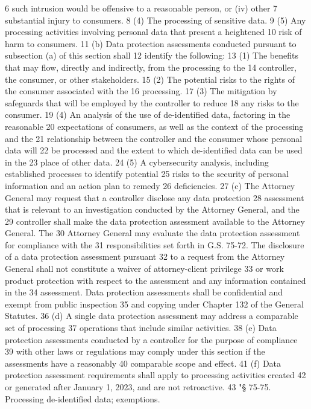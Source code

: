 6 such intrusion would be offensive to a reasonable person, or (iv) other
7 substantial injury to consumers.
8 (4) The processing of sensitive data.
9 (5) Any processing activities involving personal data that present a heightened
10 risk of harm to consumers.
11 (b) Data protection assessments conducted pursuant to subsection (a) of this section shall
12 identify the following:
13 (1) The benefits that may flow, directly and indirectly, from the processing to the
14 controller, the consumer, or other stakeholders.
15 (2) The potential risks to the rights of the consumer associated with the
16 processing.
17 (3) The mitigation by safeguards that will be employed by the controller to reduce
18 any risks to the consumer.
19 (4) An analysis of the use of de-identified data, factoring in the reasonable
20 expectations of consumers, as well as the context of the processing and the
21 relationship between the controller and the consumer whose personal data will
22 be processed and the extent to which de-identified data can be used in the
23 place of other data.
24 (5) A cybersecurity analysis, including established processes to identify potential
25 risks to the security of personal information and an action plan to remedy
26 deficiencies.
27 (c) The Attorney General may request that a controller disclose any data protection
28 assessment that is relevant to an investigation conducted by the Attorney General, and the
29 controller shall make the data protection assessment available to the Attorney General. The
30 Attorney General may evaluate the data protection assessment for compliance with the
31 responsibilities set forth in G.S. 75-72. The disclosure of a data protection assessment pursuant
32 to a request from the Attorney General shall not constitute a waiver of attorney-client privilege
33 or work product protection with respect to the assessment and any information contained in the
34 assessment. Data protection assessments shall be confidential and exempt from public inspection
35 and copying under Chapter 132 of the General Statutes.
36 (d) A single data protection assessment may address a comparable set of processing
37 operations that include similar activities.
38 (e) Data protection assessments conducted by a controller for the purpose of compliance
39 with other laws or regulations may comply under this section if the assessments have a reasonably
40 comparable scope and effect.
41 (f) Data protection assessment requirements shall apply to processing activities created
42 or generated after January 1, 2023, and are not retroactive.
43 "§ 75-75. Processing de-identified data; exemptions.
